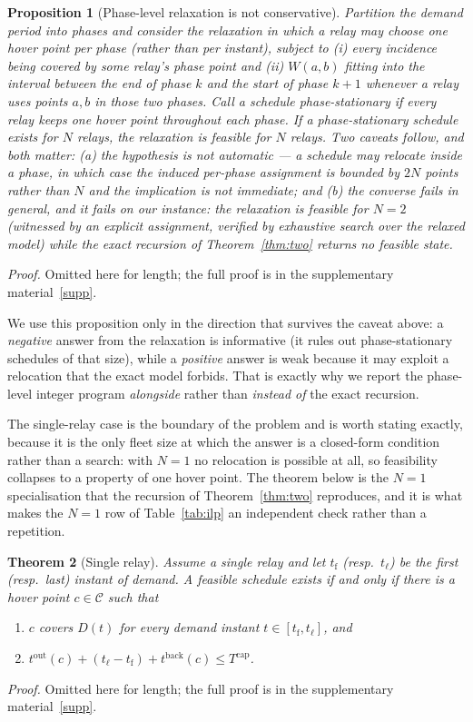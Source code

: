 \documentclass[11pt]{article}
\theoremstyle{dshplain}
\newtheorem{theorem}{Theorem}
\newtheorem{proposition}[theorem]{Proposition}
\theoremstyle{dshdefn}
\begin{document}
\begin{proposition}[Phase-level relaxation is not conservative]
\label{prop:phase}
Partition the demand period into phases and consider the relaxation in which a
relay may choose one hover point \emph{per phase} (rather than per instant),
subject to (i) every incidence being covered by some relay's phase point and
(ii) $W(a,b)$ fitting into the interval between the end of phase $k$ and the
start of phase $k+1$ whenever a relay uses points $a,b$ in those two phases.
Call a schedule \emph{phase-stationary} if every relay keeps one hover point
throughout each phase. If a phase-stationary schedule exists for $N$ relays, the
relaxation is feasible for $N$ relays. Two caveats follow, and both matter:
(a) the hypothesis is not automatic --- a schedule may relocate \emph{inside} a
phase, in which case the induced per-phase assignment is bounded by
$2N$ points rather than $N$ and the implication is not immediate; and
(b) the converse fails in general, and it fails on our instance: the relaxation is
feasible for $N=2$ (witnessed by an explicit assignment, verified by exhaustive
search over the relaxed model) while the exact recursion of
Theorem~\ref{thm:two} returns no feasible state.
\end{proposition}
\noindent\emph{Proof.} Omitted here for length; the full proof is in the supplementary material~\ref{supp}.


\noindent We use this proposition only in the direction that survives the caveat
above: a \emph{negative} answer from the relaxation is informative (it rules out
phase-stationary schedules of that size), while a \emph{positive} answer is weak
because it may exploit a relocation that the exact model forbids. That is exactly
why we report the phase-level integer program \emph{alongside} rather than
\emph{instead of} the exact recursion.

\noindent The single-relay case is the boundary of the problem and is worth
stating exactly, because it is the only fleet size at which the answer is a
closed-form condition rather than a search: with $N=1$ no relocation is possible
at all, so feasibility collapses to a property of one hover point. The theorem
below is the $N=1$ specialisation that the recursion of
Theorem~\ref{thm:two} reproduces, and it is what makes the $N=1$ row of
Table~\ref{tab:ilp} an independent check rather than a repetition.

\begin{theorem}[Single relay]
\label{thm:one}
Assume a single relay and let $t_{\mathrm{f}}$ (resp.\ $t_{\ell}$) be the first
(resp.\ last) instant of demand. A feasible schedule exists if and only if there
is a hover point $c\in\mathcal{C}$ such that
\begin{enumerate}[leftmargin=1.6em,itemsep=2pt]
\item $c$ covers $D(t)$ for every demand instant $t\in[t_{\mathrm{f}},t_{\ell}]$, and
\item $t^{\mathrm{out}}(c)+(t_{\ell}-t_{\mathrm{f}})+t^{\mathrm{back}}(c)
 \le T^{\mathrm{cap}}$.
\end{enumerate}
\end{theorem}
\noindent\emph{Proof.} Omitted here for length; the full proof is in the supplementary material~\ref{supp}.
\end{document}
